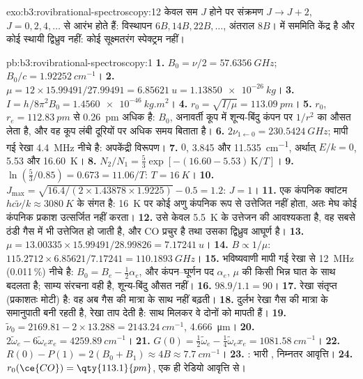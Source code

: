 \begin{solution}{exo:b3:rovibrational-spectroscopy:12}
केवल सम $J$ होने पर संक्रमण $J \to J + 2$, $J = 0, 2, 4, \dots$ से आरंभ होते हैं: विस्थापन
$6B, 14B, 22B, \dots$, अंतराल $8B$।  में सममिति केंद्र है और कोई
स्थायी द्विध्रुव नहीं: कोई सूक्ष्मतरंग स्पेक्ट्रम नहीं।
\end{solution}

\begin{solution}{pb:b3:rovibrational-spectroscopy:1}
\textbf{1.} $B_0 = \nu/2 = \qty{57.6356}{GHz}$; $B_0/c = \qty{1.92252}{cm^{-1}}$।
\textbf{2.} $\mu = 12 \times 15.99491/27.99491 = \qty{6.85621}{u} = \qty{1.13850e-26}{kg}$।
\textbf{3.} $I = h/8\pi^2B_0 = \qty{1.4560e-46}{kg.m^2}$।
\textbf{4.} $r_0 = \sqrt{I/\mu} = \qty{113.09}{pm}$।
\textbf{5.} $r_0$, $r_e = \qty{112.83}{pm}$ से \qty{0.26}{pm} अधिक है: $B_0$, अनावर्ती कूप में
शून्य-बिंदु कंपन पर $1/r^2$ का औसत लेता है, और वह कूप लंबी दूरियों पर अधिक समय
बिताता है।
\textbf{6.} $2\nu_{1\leftarrow0} = \qty{230.5424}{GHz}$; मापी गई रेखा \qty{4.4}{MHz} नीचे है:
अपकेंद्री विरूपण।
\textbf{7.} $0$, 3.845 और \qty{11.535}{cm^{-1}}, अर्थात् $E/k = 0$, 5.53 और \qty{16.60}{K}।
\textbf{8.} $N_2/N_1 = \frac53\exp[-(16.60 - 5.53)\,\mathrm K/T]$।
\textbf{9.} $\ln(\frac53/0.85) = 0.673 = 11.06/T$: $T = \qty{16}{K}$।
\textbf{10.} $J_{\max} = \sqrt{16.4/(2 \times 1.43878 \times 1.9225)} - 0.5 = 1.2$: $J = 1$।
\textbf{11.} एक कंपनिक क्वांटम $hc\tilde\nu/k \approx \qty{3080}{K}$ के संगत है:
\qty{16}{K} पर कोई अणु कंपनिक रूप से उत्तेजित नहीं होता, अतः मेघ कोई कंपनिक
प्रकाश उत्सर्जित नहीं करता।
\textbf{12.} उसे केवल \qty{5.5}{K} के उत्तेजन की आवश्यकता है, वह सबसे ठंडी
गैस में भी उत्तेजित हो जाती है, और CO प्रचुर है तथा उसका द्विध्रुव आघूर्ण है।
\textbf{13.} $\mu = 13.00335 \times 15.99491/28.99826 = \qty{7.17241}{u}$।
\textbf{14.} $B \propto 1/\mu$: $115.2712 \times 6.85621/7.17241 = \qty{110.1893}{GHz}$।
\textbf{15.} भविष्यवाणी मापी गई रेखा से \qty{12}{MHz} (0.011\,\%) नीचे है: $B_0 = B_e - \frac12\alpha_e$, और
कंपन--घूर्णन पद $\alpha_e$, $\mu$ की किसी भिन्न घात के साथ बदलता है;
साम्य संरचना वही है, शून्य-बिंदु औसत नहीं।
\textbf{16.} $98.9/1.1 = 90$।
\textbf{17.}  रेखा संतृप्त (प्रकाशतः मोटी) है: वह अब
गैस की मात्रा के साथ नहीं बढ़ती।
\textbf{18.} दुर्लभ  रेखा गैस की मात्रा के समानुपाती बनी रहती है,
 रेखा ताप देती है: साथ मिलकर वे दोनों को मापती हैं।
\textbf{19.} $\tilde\nu_0 = 2169.81 - 2 \times 13.288 = \qty{2143.24}{cm^{-1}}$, \qty{4.666}{\micro m}।
\textbf{20.} $2\tilde\omega_e - 6\tilde\omega_ex_e = \qty{4259.89}{cm^{-1}}$।
\textbf{21.} $G(0) = \frac12\tilde\omega_e - \frac14\tilde\omega_ex_e = \qty{1081.58}{cm^{-1}}$।
\textbf{22.} $R(0) - P(1) = 2(B_0 + B_1) \approx 4B \approx \qty{7.7}{cm^{-1}}$।
\textbf{23.} : भारी , निम्नतर आवृत्ति।
\textbf{24.} \textbf{$r_0(\ce{CO}) = \qty{113.1}{pm}$}, एक ही रेडियो आवृत्ति से।
\end{solution}

